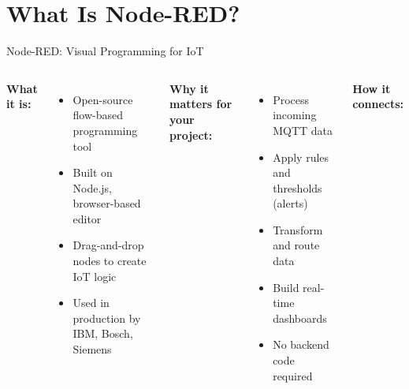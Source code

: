 \documentclass[aspectratio=169,11pt]{beamer}
\begin{document}
\section{What Is Node-RED?}

\begin{frame}[shrink=5]{Node-RED: Visual Programming for IoT}
    \begin{columns}
        \textbf{What it is:}
        \begin{itemize}
            \item Open-source flow-based programming tool
            \item Built on Node.js, browser-based editor
            \item Drag-and-drop nodes to create IoT logic
            \item Used in production by IBM, Bosch, Siemens
        \end{itemize}

        \vspace{0.15cm}
        \textbf{Why it matters for your project:}
        \begin{itemize}
            \item Process incoming MQTT data
            \item Apply rules and thresholds (alerts)
            \item Transform and route data
            \item Build real-time dashboards
            \item No backend code required
        \end{itemize}

        \textbf{How it connects:}

        \vspace{0.1cm}
\end{columns}
\end{frame}
\end{document}
